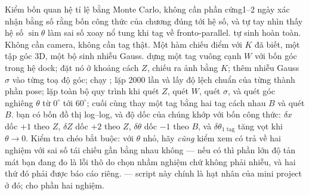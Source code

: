 \documentclass[../../marker.tex]{subfiles}
\begin{document}
\begin{ungdung}
\end{ungdung}

\begin{duan}{Kiểm bốn quan hệ tỉ lệ bằng Monte Carlo, không cần phần cứng}{1--2 ngày}
\dmt xác nhận bằng số rằng bốn công thức của chương đúng tới hệ số, và tự tay nhìn thấy hệ số \(\sin\theta\) làm sai số xoay nổ tung khi tag về fronto-parallel.
\ddl tự sinh hoàn toàn. Không cần camera, không cần tag thật. Một hàm chiếu điểm với \(K\) đã biết, một tập góc 3D, một bộ sinh nhiễu Gauss.
\dbc dựng một tag vuông cạnh \(W\) với bốn góc trong hệ dock; đặt nó ở khoảng cách \(Z\), chiếu ra ảnh bằng \(K\); thêm nhiễu Gauss \(\sigma\) vào từng toạ độ góc; chạy ; lặp 2000 lần và lấy độ lệch chuẩn của từng thành phần pose; lặp toàn bộ quy trình khi quét \(Z\), quét \(W\), quét \(\sigma\), và quét góc nghiêng \(\theta\) từ \(0^\circ\) tới \(60^\circ\); cuối cùng thay một tag bằng hai tag cách nhau \(B\) và quét \(B\).
\dxk bạn có bốn đồ thị log--log, và độ dốc của chúng khớp với bốn công thức: \(\delta x\) dốc \(+1\) theo \(Z\), \(\delta Z\) dốc \(+2\) theo \(Z\), \(\delta\theta\) dốc \(-1\) theo \(B\), và \(\delta\theta_{\text{1 tag}}\) tăng vọt khi \(\theta \to 0\). Kiểm tra chéo bắt buộc: với \(\theta\) nhỏ, hãy \emph{cũng} kiểm xem  có trả về hai nghiệm với sai số tái chiếu gần bằng nhau không --- nếu có thì phần lớn độ tản mát bạn đang đo là lỗi thô do chọn nhầm nghiệm chứ không phải nhiễu, và hai thứ đó phải được báo cáo riêng.
\dnv {} --- script này chính là hạt nhân của mini project ở đó;  cho phần hai nghiệm.
\end{duan}
\end{document}
